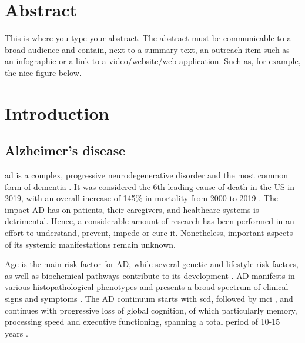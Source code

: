 \documentclass{amsart}
\newcommand{\mainmatter}{
    \newpage
    \pagenumbering{arabic}  %
}
\begin{document}
\newpage
\section*{Abstract}
This is where you type your abstract.
The abstract must be communicable to a broad audience and contain, next to a summary text, an outreach item such as an infographic or a link to a video/website/web application.
Such as, for example, the nice figure below.


\clearpage
\printacronyms[title = Abbreviations, toctitle = Abbreviations]

\newpage
\tableofcontents

\mainmatter

\newpage
\section{Introduction}\label{Intro}
\subsection{Alzheimer’s disease}
\acrfull{ad} is a complex, progressive neurodegenerative disorder and the most common form of dementia \cite{Penke2023NewDisease}. It was considered the 6th leading cause of death in the US in 2019, with an overall increase of 145\% in mortality from 2000 to 2019 \cite{20232023Figures}. The impact AD has on patients, their caregivers, and healthcare systems is detrimental. Hence, a considerable amount of research has been performed in an effort to understand, prevent, impede or cure it. Nonetheless, important aspects of its systemic manifestations remain unknown.

Age is the main risk factor for AD, while several genetic and lifestyle risk factors, as well as biochemical pathways contribute to its development \cite{Penke2023NewDisease}. AD manifests in various histopathological phenotypes and presents a broad spectrum of clinical signs and symptoms \cite{Heneka2015NeuroinflammationDisease, Edwards2019ANeurodegeneration}. The AD continuum starts with \acrfull{scd}, followed by \acrfull{mci} \cite*{AALDIJK2022101556}, and continues with progressive loss of global cognition, of which particularly memory, processing speed and executive functioning, spanning a total period of 10-15 years \cite{Scheltens2016AlzheimersDisease}. 
\end{document}
